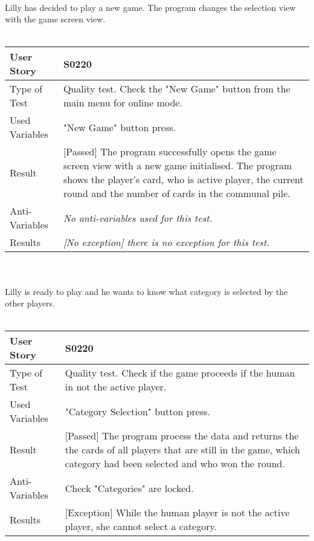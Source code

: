 \vspace{0.2cm}\\
Lilly has decided to play a new game. The program changes the selection view with the game screen view.\\
\vspace{0.2cm}\\  
\begin{tabular}{l | p{12cm}}
User Story & \textbf{S0220}\\ \hline
Type of Test & Quality test. Check the "New Game" button from the main menu for online mode.\\ \hline
Used Variables & "New Game" button press.\\ \hline
Result & [Passed] The program successfully opens the game screen view with a new game initialised. The program shows the player's card, who is active player, the current round and the number of cards in the communal pile.\\ \hline
Anti-Variables & \textit{No anti-variables used for this test.}\\ \hline
Results & \textit{[No exception] there is no exception for this test.}\\ \hline
\end{tabular}\\
\vspace{0.2cm}\\  
Lilly is ready to play and he wants to know what category is selected by the other players.\\
\vspace{0.2cm}\\
\begin{tabular}{l | p{12cm}}
User Story & \textbf{S0220}\\ \hline
Type of Test & Quality test. Check if the game proceeds if the human in not the active player.\\ \hline
Used Variables & "Category Selection" button press.\\ \hline
Result & [Passed] The program process the data and returns the the cards of all players that are still in the game, which category had been selected and who won the round.\\ \hline
Anti-Variables & Check "Categories" are locked.\\ \hline
Results & [Exception] While the human player is not the active player, she cannot select a category.\\ \hline
\end{tabular}\\
